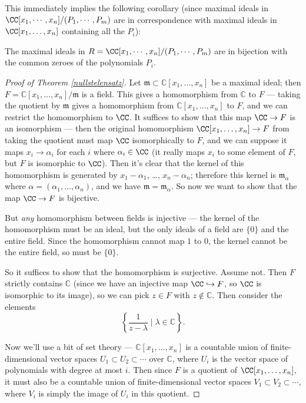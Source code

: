 This immediately implies the following corollary (since maximal ideals in $\CC[x_1, \cdots, x_n]/(P_1, \cdots, P_m)$ are in correspondence with maximal ideals in $\CC[x_1, \ldots, x_n]$ containing all the $P_i$):

\begin{corollary}
The maximal ideals in $R = \CC[x_1, \cdots, x_n]/(P_1, \cdots, P_m)$ are in bijection with the common zeroes of the polynomials $P_i$.
\end{corollary}

\begin{proof}[Proof of Theorem \ref{nullstelensatz}]
Let $\mathfrak{m} \subset \mathbb{C}[x_1, \ldots, x_n]$ be a maximal ideal; then $F = \mathbb{C}[x_1, \ldots, x_n]/\mathfrak{m}$ is a field. This gives a homomorphism from $\mathbb{C}$ to $F$ --- taking the quotient by $\mathfrak{m}$ gives a homomorphism from $\mathbb{C}[x_1, \ldots, x_n]$ to $F$, and we can restrict the homomorphism to $\CC$. It suffices to show that this map $\CC \to F$ is an isomorphism --- then the original homomorphism $\CC[x_1, \ldots, x_n] \to F$ from taking the quotient must map $\CC$ isomorphically to $F$, and we can suppose it maps $x_i \to \alpha_i$ for each $i$ where $\alpha_i \in \CC$ (it really maps $x_i$ to some element of $F$, but $F$ is isomorphic to $\CC$). Then it's clear that the kernel of this homomorphism is generated by $x_1 - \alpha_1$, \ldots, $x_n - \alpha_n$; therefore this kernel is $\mathfrak{m}_\alpha$ where $\alpha = (\alpha_1, \ldots, \alpha_n)$, and we have $\mathfrak{m} = \mathfrak{m}_\alpha$. So now we want to show that the map $\CC \to F$ is bijective. 

But \emph{any} homomorphism between fields is injective --- the kernel of the homomorphism must be an ideal, but the only ideals of a field are $\{0\}$ and the entire field. Since the homomorphism cannot map $1$ to $0$, the kernel cannot be the entire field, so must be $\{0\}$. 

So it suffices to show that the homomorphism is surjective. Assume not. Then $F$ strictly contains $\mathbb{C}$ (since we have an injective map $\CC \hookrightarrow F$, so $\CC$ is isomorphic to its image), so we can pick $z \in F$ with $z \not\in \mathbb{C}$. Then consider the elements \[\left\{ \frac{1}{z - \lambda} \mid \lambda \in \mathbb{C}\right\}.\] 

Now we'll use a bit of set theory --- $\mathbb{C}[x_1, \ldots, x_n]$ is a countable union of finite-dimensional vector spaces $U_1 \subset U_2 \subset \cdots$ over $\mathbb{C}$, where $U_i$ is the vector space of polynomials with degree at most $i$. Then since $F$ is a quotient of $\CC[x_1, \ldots, x_n]$, it must also be a countable union of finite-dimensional vector spaces $V_1 \subset V_2 \subset \cdots$, where $V_i$ is simply the image of $U_i$ in this quotient. 


\end{proof}
